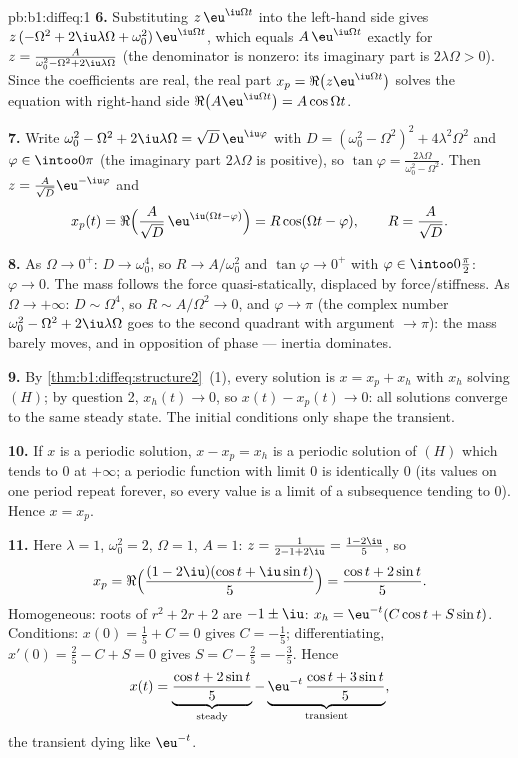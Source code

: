 \begin{solution}{pb:b1:diffeq:1}
\textbf{6.} Substituting $z\,\eu^{\iu\Omega t}$ into the left-hand
side gives $z\,(-\Omega^2 + 2\iu\lambda\Omega +
\omega_0^2)\,\eu^{\iu\Omega t}$, which equals $A\,\eu^{\iu\Omega
t}$ exactly for $z = \frac{A}{\omega_0^2 - \Omega^2 +
2\iu\lambda\Omega}$ (the denominator is nonzero: its imaginary
part is $2\lambda\Omega > 0$). Since the coefficients are real,
the real part $x_p = \Re\bigl(z\eu^{\iu\Omega t}\bigr)$ solves the
equation with right-hand side $\Re\bigl(A\eu^{\iu\Omega t}\bigr) =
A\cos\Omega t$.

\textbf{7.} Write $\omega_0^2 - \Omega^2 + 2\iu\lambda\Omega =
\sqrt{D}\,\eu^{\iu\varphi}$ with $D = (\omega_0^2 - \Omega^2)^2 +
4\lambda^2\Omega^2$ and $\varphi \in \intoo0\pi$ (the imaginary
part $2\lambda\Omega$ is positive), so $\tan\varphi =
\frac{2\lambda\Omega}{\omega_0^2 - \Omega^2}$. Then $z =
\frac{A}{\sqrt D}\eu^{-\iu\varphi}$ and
\[
x_p(t) = \Re\Bigl(\frac A{\sqrt D}\,\eu^{\iu(\Omega t -
\varphi)}\Bigr) = R\cos(\Omega t - \varphi),
\qquad R = \frac A{\sqrt D} .
\]

\textbf{8.} As $\Omega \to 0^+$: $D \to \omega_0^4$, so $R \to
A/\omega_0^2$ and $\tan\varphi \to 0^+$ with $\varphi \in
\intoo0{\frac\pi2}$: $\varphi \to 0$. The mass follows the force
quasi-statically, displaced by force/stiffness. As $\Omega \to
+\infty$: $D \sim \Omega^4$, so $R \sim A/\Omega^2 \to 0$, and
$\varphi \to \pi$ (the complex number $\omega_0^2 - \Omega^2 +
2\iu\lambda\Omega$ goes to the second quadrant with argument $\to
\pi$): the mass barely moves, and in opposition of phase ---
inertia dominates.

\textbf{9.} By \cref{thm:b1:diffeq:structure2}~(1), every solution
is $x = x_p + x_h$ with $x_h$ solving $(H)$; by question 2, $x_h(t)
\to 0$, so $x(t) - x_p(t) \to 0$: all solutions converge to the
same steady state. The initial conditions only shape the transient.

\textbf{10.} If $x$ is a periodic solution, $x - x_p = x_h$ is a
periodic solution of $(H)$ which tends to $0$ at $+\infty$; a
periodic function with limit $0$ is identically $0$ (its values on
one period repeat forever, so every value is a limit of a
subsequence tending to $0$). Hence $x = x_p$.

\textbf{11.} Here $\lambda = 1$, $\omega_0^2 = 2$, $\Omega = 1$,
$A = 1$: $z = \frac1{2 - 1 + 2\iu} = \frac{1 - 2\iu}5$, so
\[
x_p = \Re\Bigl(\frac{(1 - 2\iu)(\cos t + \iu\sin t)}5\Bigr)
= \frac{\cos t + 2\sin t}5 .
\]
Homogeneous: roots of $r^2 + 2r + 2$ are $-1 \pm \iu$: $x_h =
\eu^{-t}(C\cos t + S\sin t)$. Conditions: $x(0) = \frac15 + C = 0$
gives $C = -\frac15$; differentiating, $x'(0) = \frac25 - C + S =
0$ gives $S = C - \frac25 = -\frac35$. Hence
\[
x(t) = \underbrace{\frac{\cos t + 2\sin t}5}_{\text{steady}}
- \underbrace{\eu^{-t}\,\frac{\cos t + 3\sin
t}5}_{\text{transient}} ,
\]
the transient dying like $\eu^{-t}$.


\end{solution}
